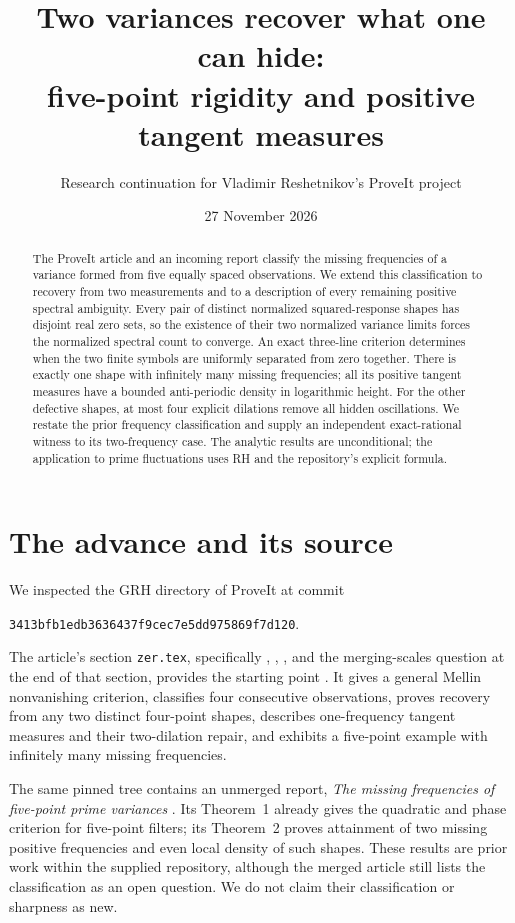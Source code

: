\documentclass[11pt]{article}
\title{Two variances recover what one can hide:\\five-point rigidity and positive tangent measures}
\author{Research continuation for Vladimir Reshetnikov's ProveIt project}
\date{27 November 2026}
\theoremstyle{definition}\newtheorem{definition}[theorem]{Definition}
\theoremstyle{remark}\newtheorem{remark}[theorem]{Remark}
\newcommand{\pin}{3413bfb1edb3636437f9cec7e5dd975869f7d120}
\begin{document}
\maketitle
\begin{abstract}
The ProveIt article and an incoming report classify the missing frequencies of a variance
formed from five equally spaced observations. We extend this classification to recovery from
two measurements and to a description of every remaining positive spectral ambiguity.
Every pair of distinct normalized squared-response shapes has disjoint real zero sets, so
the existence of their two normalized variance limits forces the normalized spectral count
to converge. An exact three-line criterion determines when the two finite symbols are
uniformly separated from zero together. There is exactly one shape with infinitely many
missing frequencies; all its positive tangent measures have a bounded anti-periodic
density in logarithmic height. For the other defective shapes, at most four explicit
dilations remove all hidden oscillations. We restate the prior frequency classification
and supply an independent exact-rational witness to its two-frequency case.
The analytic results are unconditional; the application to prime fluctuations uses RH
and the repository's explicit formula.
\end{abstract}

\section{The advance and its source}

We inspected the GRH directory of ProveIt at commit
\begin{center}\small\texttt{\pin}.\end{center}
The article's section \texttt{zer.tex}, specifically
, ,
, and the merging-scales question at the end of that section,
provides the starting point \cite{ProveIt}. It gives a general Mellin nonvanishing criterion,
classifies four consecutive observations, proves recovery from any two distinct four-point
shapes, describes one-frequency tangent measures and their two-dilation repair, and exhibits
a five-point example with infinitely many missing frequencies.

The same pinned tree contains an unmerged report, \emph{The missing frequencies of
five-point prime variances} \cite{FiveNodePrior}. Its Theorem~1 already gives the quadratic
and phase criterion for five-point filters; its Theorem~2 proves attainment of two missing
positive frequencies and even local density of such shapes. These results are prior work
within the supplied repository, although the merged article still lists the classification
as an open question. We do not claim their classification or sharpness as new.
\end{document}
